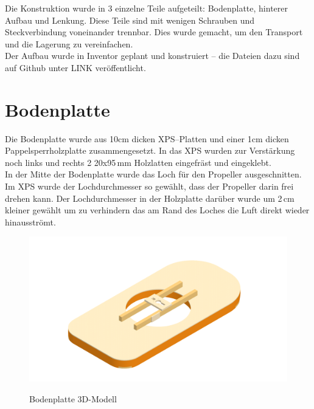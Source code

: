 Die Konstruktion wurde in 3 einzelne Teile aufgeteilt: Bodenplatte, hinterer Aufbau und Lenkung. Diese Teile sind mit wenigen Schrauben und Steckverbindung voneinander trennbar. Dies wurde gemacht, um den Transport und die Lagerung zu vereinfachen.\\
Der Aufbau wurde in Inventor geplant und konstruiert -- die Dateien dazu sind auf Github unter LINK veröffentlicht.


\newpage
\section{Bodenplatte}
Die Bodenplatte wurde aus 10cm dicken XPS--Platten und einer 1cm dicken Pappelsperrholzplatte zusammengesetzt. In das XPS wurden zur Verstärkung noch links und rechts 2 20x95\,mm Holzlatten eingefräst und eingeklebt.\\
In der Mitte der Bodenplatte wurde das Loch für den Propeller ausgeschnitten. Im XPS wurde der Lochdurchmesser so gewählt, dass der Propeller darin frei drehen kann. Der Lochdurchmesser in der Holzplatte darüber wurde um 2\,cm kleiner gewählt um zu verhindern das am Rand des Loches die Luft direkt wieder hinausströmt.

\begin{figure}[H]
    \centering
    \includegraphics[width=\textwidth]{../../../../Inventor/Bodenplatte/png/BodenplatteHauptansicht.png}
    \label{fig:konst:bodenplatte:gesamt}
    \caption{Bodenplatte 3D-Modell}
\end{figure}

